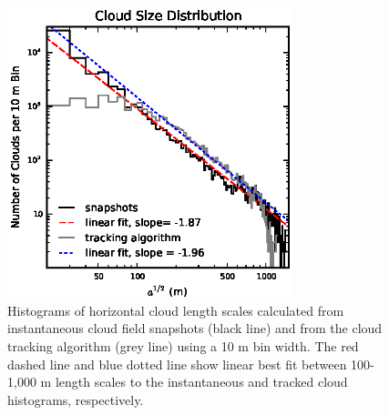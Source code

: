 \documentclass[acp]{copernicus}
\begin{document}
\begin{figure}[t]
\vspace*{2mm}
\begin{center}
\includegraphics[width=8.3cm]{./figures/cloud_areas}
\end{center}
\caption{Histograms of horizontal cloud length scales calculated from 
instantaneous cloud field snapshots (black line) and from the cloud tracking 
algorithm (grey line) using a 10 m bin width. The red dashed line and blue 
dotted line show linear best fit between 100-1,000 m length scales to the 
instantaneous and tracked cloud histograms, respectively.}
\label{fig:cloud_areas}
\end{figure}
\end{document}
